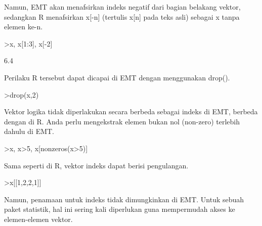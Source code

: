 \documentclass{article}
\newenvironment{eulernotebook}{\par}{\par}
\newenvironment{eulercomment}{\par\medskip}{\par\medskip}
\begin{document}
\begin{eulernotebook}
\begin{eulercomment}
\begin{eulercomment}
\begin{eulercomment}
\begin{eulercomment}
\begin{eulercomment}
Namun, EMT akan menafsirkan indeks negatif dari bagian belakang
vektor, sedangkan R menafsirkan x[-n] (tertulis x[n] pada teks asli)
sebagai x tanpa elemen ke-n.
\end{eulercomment}
\begin{eulerprompt}
>x, x[1:3], x[-2]
\end{eulerprompt}
\begin{euleroutput}
  [10.4,  5.6,  3.1,  6.4,  21.7]
  [10.4,  5.6,  3.1]
  6.4
\end{euleroutput}
\begin{eulercomment}
Perilaku R tersebut dapat dicapai di EMT dengan menggunakan drop().
\end{eulercomment}
\begin{eulerprompt}
>drop(x,2)
\end{eulerprompt}
\begin{euleroutput}
  [10.4,  3.1,  6.4,  21.7]
\end{euleroutput}
\begin{eulercomment}
Vektor logika tidak diperlakukan secara berbeda sebagai indeks di EMT,
berbeda dengan di R. Anda perlu mengekstrak elemen bukan nol
(non-zero) terlebih dahulu di EMT.
\end{eulercomment}
\begin{eulerprompt}
>x, x>5, x[nonzeros(x>5)]
\end{eulerprompt}
\begin{euleroutput}
  [10.4,  5.6,  3.1,  6.4,  21.7]
  [1,  1,  0,  1,  1]
  [10.4,  5.6,  6.4,  21.7]
\end{euleroutput}
\begin{eulercomment}
Sama seperti di R, vektor indeks dapat berisi pengulangan.
\end{eulercomment}
\begin{eulerprompt}
>x[[1,2,2,1]]
\end{eulerprompt}
\begin{euleroutput}
  [10.4,  5.6,  5.6,  10.4]
\end{euleroutput}
\begin{eulercomment}
Namun, penamaan untuk indeks tidak dimungkinkan di EMT. Untuk sebuah
paket statistik, hal ini sering kali diperlukan guna mempermudah akses
ke elemen-elemen vektor.


\end{eulercomment}
\end{eulercomment}
\end{eulercomment}
\end{eulercomment}
\end{eulercomment}
\end{eulernotebook}
\end{document}
